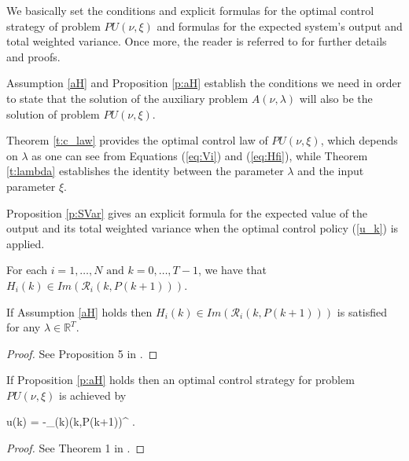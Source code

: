 We basically set the conditions and explicit formulas for the optimal control strategy of problem $PU(\nu,\xi)$ and formulas for the expected system's output and total weighted variance.
Once more, the reader is referred to \cite{alexandre} for further details and proofs.

Assumption \ref{aH} and Proposition \ref{p:aH} establish the conditions we need in order to 
state that the solution of the auxiliary problem $A(\nu, \lambda)$ will also be the solution of problem $PU(\nu,\xi)$.

Theorem \ref{t:c_law} provides the optimal control law of $PU(\nu,\xi)$, which depends on $\lambda$ as one can see from Equations  (\ref{eq:Vi}) and (\ref{eq:Hfi}), while Theorem \ref{t:lambda} establishes the identity between the parameter $\lambda$ and the input parameter $\xi$.

Proposition \ref{p:SVar} gives an explicit formula for the expected value of the output and its total weighted variance when the optimal control policy (\ref{u_k}) is applied.

\begin{assumption} \label{aH}
	For each $i=1, \dotsc, N \text{ and } k=0, \dotsc, T-1$, we have that 
	$H_{i}(k) \in Im(\mathcal{R}_{i}(k,P(k+1)))$.
\end{assumption}

\begin{prop} \label{p:aH}
	If Assumption \ref{aH} holds then
	$H_{i}(k) \in Im(\mathcal{R}_{i}(k,P(k+1)))$ 
	is satisfied for any $\lambda \in \mathbb{R}^{T}$.
\end{prop}

\begin{proof}
	See Proposition 5 in \cite{alexandre}.
\end{proof}

\begin{theorem} \label{t:c_law}
If Proposition \ref{p:aH} holds then an optimal control strategy for problem $PU(\nu,\xi)$ is achieved by
	\begin{flalign} \label{u_k} 
		u(k) = -_{\theta(k)}(k,P(k+1))^{\dagger} 
		.
	\end{flalign}
\end{theorem}

\begin{proof}
	See Theorem 1 in \cite{alexandre}.
\end{proof}

